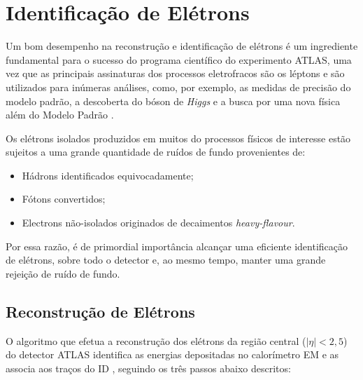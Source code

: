 \chapter{Identificação de Elétrons}\label{cap:identificacao}

Um bom desempenho na reconstrução e identificação de elétrons é um ingrediente fundamental para o sucesso do programa científico do experimento ATLAS, uma vez que as principais assinaturas dos processos eletrofracos são os léptons \cite{alison2014road} e são utilizados para inúmeras análises, como, por exemplo, as medidas de precisão do modelo padrão, a descoberta do bóson de \emph{Higgs} e a busca por uma nova física além do Modelo Padrão \cite{aad2014electron}.


Os elétrons isolados produzidos em muitos do processos físicos de interesse estão sujeitos a uma grande quantidade de ruídos de fundo provenientes de:
\begin{itemize}
  \item Hádrons identificados equivocadamente;
  \item Fótons convertidos;
  \item Electrons não-isolados originados de decaimentos \emph{heavy-flavour}.
\end{itemize}

Por essa razão, é de primordial importância alcançar uma eficiente identificação de elétrons, sobre todo o detector e, ao mesmo tempo, manter uma grande rejeição de ruído de fundo.

\section{Reconstrução de Elétrons}\label{sec:rec_ele}

O algoritmo que efetua a reconstrução dos elétrons da região central ($|\eta| < 2,5$) do detector ATLAS identifica as energias depositadas no calorímetro EM e as associa aos traços do ID \cite{aad2014electron}, seguindo os três passos abaixo descritos:

